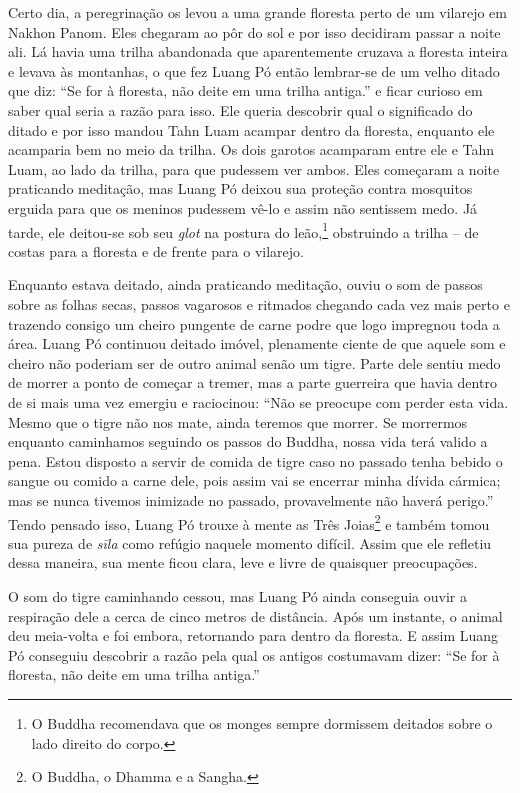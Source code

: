 Certo dia, a peregrinação os levou a uma grande floresta perto de um
vilarejo em Nakhon Panom. Eles chegaram ao pôr do sol e por isso
decidiram passar a noite ali. Lá havia uma trilha abandonada que
aparentemente cruzava a floresta inteira e levava às montanhas, o que
fez Luang Pó então lembrar-se de um velho ditado que diz: ``Se for à
floresta, não deite em uma trilha antiga.'' e ficar curioso em saber
qual seria a razão para isso. Ele queria descobrir qual o significado do
ditado e por isso mandou Tahn Luam acampar dentro da floresta, enquanto
ele acamparia bem no meio da trilha. Os dois garotos acamparam entre ele
e Tahn Luam, ao lado da trilha, para que pudessem ver ambos. Eles
começaram a noite praticando meditação, mas Luang Pó deixou sua proteção
contra mosquitos erguida para que os meninos pudessem vê-lo e assim não
sentissem medo. Já tarde, ele deitou-se sob seu \emph{glot} na postura
do leão,\footnote{O Buddha recomendava que os monges sempre dormissem
  deitados sobre o lado direito do corpo.} obstruindo a trilha -- de
costas para a floresta e de frente para o vilarejo.

Enquanto estava deitado, ainda praticando meditação, ouviu o som de
passos sobre as folhas secas, passos vagarosos e ritmados chegando cada
vez mais perto e trazendo consigo um cheiro pungente de carne podre que
logo impregnou toda a área. Luang Pó continuou deitado imóvel,
plenamente ciente de que aquele som e cheiro não poderiam ser de outro
animal senão um tigre. Parte dele sentiu medo de morrer a ponto de
começar a tremer, mas a parte guerreira que havia dentro de si mais uma
vez emergiu e raciocinou: ``Não se preocupe com perder esta vida. Mesmo
que o tigre não nos mate, ainda teremos que morrer. Se morrermos
enquanto caminhamos seguindo os passos do Buddha, nossa vida terá valido
a pena. Estou disposto a servir de comida de tigre caso no passado tenha
bebido o sangue ou comido a carne dele, pois assim vai se encerrar minha
dívida cármica; mas se nunca tivemos inimizade no passado, provavelmente
não haverá perigo.'' Tendo pensado isso, Luang Pó trouxe à mente as Três
Joias\footnote{O Buddha, o Dhamma e a Sangha.} e também tomou sua pureza
de \emph{sīla} como refúgio naquele momento difícil. Assim que ele
refletiu dessa maneira, sua mente ficou clara, leve e livre de quaisquer
preocupações.

O som do tigre caminhando cessou, mas Luang Pó ainda conseguia ouvir a
respiração dele a cerca de cinco metros de distância. Após um instante,
o animal deu meia-volta e foi embora, retornando para dentro da
floresta. E assim Luang Pó conseguiu descobrir a razão pela qual os
antigos costumavam dizer: ``Se for à floresta, não deite em uma trilha
antiga.''

